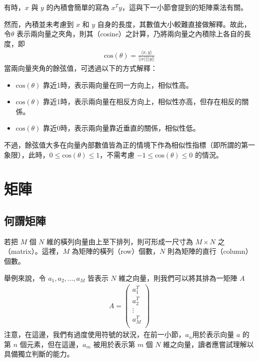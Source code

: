 \documentclass[letterpaper,10pt,english]{sphinxmanual}
\begin{document}
有時，\(x\) 與 \(y\) 的內積會簡單的寫為 \(x^T y\)，這與下一小節會提到的矩陣乘法有關。

然而，內積並未考慮到 \(x\) 和 \(y\) 自身的長度，其數值大小較難直接做解釋。故此，令\(\theta\) 表示兩向量之夾角，則其（cosine）之計算，乃將兩向量之內積除上各自的長度，即
\begin{equation*}
\begin{split}
\text{cos}(\theta) = \frac{\langle x,y \rangle}{||x|| ||y||}
\end{split}
\end{equation*}
當兩向量夾角的餘弦值，可透過以下的方式解釋：
\begin{itemize}
\item {} 
\(\text{cos}(\theta)\) 靠近1時，表示兩向量在同一方向上，相似性高。

\item {} 
\(\text{cos}(\theta)\) 靠近\sphinxhyphen{}1時，表示兩向量在相反方向上，相似性亦高，但存在相反的關係。

\item {} 
\(\text{cos}(\theta)\) 靠近0時，表示兩向量靠近垂直的關係，相似性低。

\end{itemize}

不過，餘弦值大多在向量內部數值皆為正的情境下作為相似性指標（即所謂的第一象限），此時，\(0 \leq\text{cos}(\theta) \leq 1\)，不需考慮 \(-1 \leq\text{cos}(\theta) \leq 0\) 的情況。


\section{矩陣}
\label{\detokenize{notebook/mathematics-prerequisite:id6}}

\subsection{何謂矩陣}
\label{\detokenize{notebook/mathematics-prerequisite:id7}}
若把 \(M\) 個 \(N\) 維的橫列向量由上至下排列，則可形成一尺寸為 \(M \times N\) 之（matrix）。這裡，\(M\) 為矩陣的橫列（row）個數，\(N\) 則為矩陣的直行（column）個數。

舉例來說，令 \(a_1, a_2,...,a_M\) 皆表示 \(N\) 維之向量，則我們可以將其排為一矩陣 \(A\)
\begin{equation*}
\begin{split}
A =
\begin{pmatrix}
  a_{1}^T \\
   a_{2}^T \\
    \vdots \\
     a_{M}^T \\
 \end{pmatrix}\end{split}
\end{equation*}
注意，在這邊，我們有過度使用符號的狀況，在前一小節，\(a_n\)用於表示向量 \(a\) 的第 \(n\) 個元素，但在這邊，\(a_m\) 被用於表示第 \(m\) 個 \(N\) 維之向量，讀者應嘗試理解以具備獨立判斷的能力。
\end{document}
